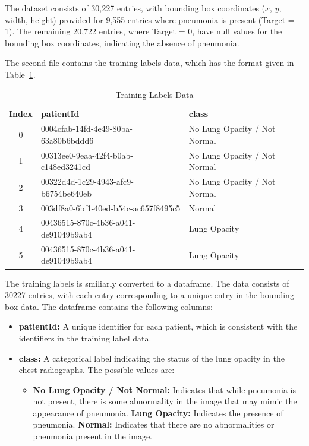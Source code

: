 The dataset consists of 30,227 entries, with bounding box coordinates ($x$, $y$, width, height) provided for 9,555 entries where pneumonia is present (Target = 1). The remaining 20,722 entries, where Target = 0, have null values for the bounding box coordinates, indicating the absence of pneumonia.

The second file contains the training labels data, which has the format given in Table~\ref{tab:cha-2 table2}.

\begin{table}[h!]
    \centering
    \caption{Training Labels Data}
    \label{tab:cha-2 table2}
    \begin{tabular}{c|l|l}
        \rowcolor{gray!20}
        \textbf{Index} & \textbf{patientId}                   & \textbf{class}               \\
        0              & 0004cfab-14fd-4e49-80ba-63a80b6bddd6 & No Lung Opacity / Not Normal \\
        1              & 00313ee0-9eaa-42f4-b0ab-c148ed3241cd & No Lung Opacity / Not Normal \\
        2              & 00322d4d-1c29-4943-afc9-b6754be640eb & No Lung Opacity / Not Normal \\
        3              & 003df8a0-6bf1-40ed-b54c-ac657f8495c5 & Normal                       \\
        4              & 00436515-870c-4b36-a041-de91049b9ab4 & Lung Opacity                 \\
        5              & 00436515-870c-4b36-a041-de91049b9ab4 & Lung Opacity                 \\
    \end{tabular}
\end{table}


The training labels is smiliarly converted to a dataframe. The data consists of 30227 entries, with each entry corresponding to a unique entry in the bounding box data. The dataframe contains the following columns:

\begin{itemize}
    \item \textbf{patientId:} A unique identifier for each patient, which is consistent with the identifiers in the training label data.
    \item \textbf{class:} A categorical label indicating the status of the lung opacity in the chest radiographs. The possible values are:
          \begin{itemize}
              \item \textbf{No Lung Opacity / Not Normal:} Indicates that while pneumonia is not present, there is some abnormality in the image that may mimic the appearance of pneumonia.
                    \textbf{Lung Opacity:} Indicates the presence of pneumonia.
                    \textbf{Normal:} Indicates that there are no abnormalities or pneumonia present in the image.
          \end{itemize}
\end{itemize}

